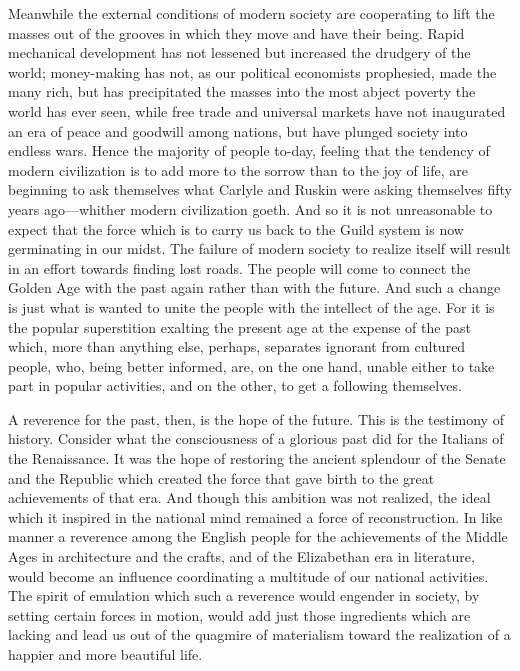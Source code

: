 \documentclass{book}
\begin{document}
Meanwhile the external conditions of modern society are cooperating to lift the masses out of the grooves in which they move and have their being. Rapid mechanical development has not lessened but increased the drudgery of the world; money-making has not, as our political economists prophesied, made the many rich, but has precipitated the masses into the most abject poverty the world has ever seen, while free trade and universal markets have not inaugurated an era of peace and goodwill among nations, but have plunged society into endless wars. Hence the majority of people to-day, feeling that the tendency of modern civilization is to add more to the sorrow than to the joy of life, are beginning to ask themselves what Carlyle and Ruskin were asking themselves fifty years ago—whither modern civilization goeth. And so it is not unreasonable to expect that the force which is to carry us back to the Guild system is now germinating in our midst. The failure of modern society to realize itself will result in an effort towards finding lost roads. The people will come to connect the Golden Age with the past again rather than with the future. And such a change is just what is wanted to unite the people with the intellect of the age. For it is the popular superstition exalting the present age at the expense of the past which, more than anything else, perhaps, separates ignorant from cultured people, who, being better informed, are, on the one hand, unable either to take part in popular activities, and on the other, to get a following themselves.

A reverence for the past, then, is the hope of the future. This is the testimony of history. Consider what the consciousness of a glorious past did for the Italians of the Renaissance. It was the hope of restoring the ancient splendour of the Senate and the Republic which created the force that gave birth to the great achievements of that era. And though this ambition was not realized, the ideal which it inspired in the national mind remained a force of reconstruction. In like manner a reverence among the English people for the achievements of the Middle Ages in architecture and the crafts, and of the Elizabethan era in literature, would become an influence coordinating a multitude of our national activities. The spirit of emulation which such a reverence would engender in society, by setting certain forces in motion, would add just those ingredients which are lacking and lead us out of the quagmire of materialism toward the realization of a happier and more beautiful life.
\end{document}
